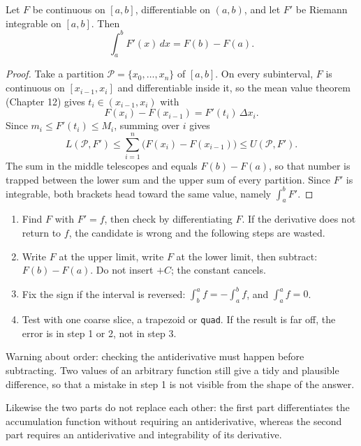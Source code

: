 \begin{teorema}
Let $F$ be continuous on $[a,b]$, differentiable on $(a,b)$, and let $F'$ be
Riemann integrable on $[a,b]$. Then
\[
\int_a^b F'(x)\,dx=F(b)-F(a).
\]
\end{teorema}

\begin{proof}
Take a partition $\mathcal{P}=\{x_0,\dots,x_n\}$ of $[a,b]$. On every subinterval, $F$ is
continuous on $[x_{i-1},x_i]$ and differentiable inside it, so the mean value
theorem (Chapter 12) gives $t_i\in(x_{i-1},x_i)$ with
\[
F(x_i)-F(x_{i-1})=F'(t_i)\,\Delta x_i .
\]
Since $m_i\le F'(t_i)\le M_i$, summing over $i$ gives
\[
L(\mathcal{P},F')\le\sum_{i=1}^{n}\bigl(F(x_i)-F(x_{i-1})\bigr)\le U(\mathcal{P},F').
\]
The sum in the middle telescopes and equals $F(b)-F(a)$, so that number is trapped
between the lower sum and the upper sum of every partition. Since $F'$ is integrable, both
brackets head toward the same value, namely $\int_a^b F'$.
\end{proof}

\begin{resep}
\begin{enumerate}
\item Find $F$ with $F'=f$, then check by differentiating $F$. If the derivative does not
      return to $f$, the candidate is wrong and the following steps are wasted.
\item Write $F$ at the upper limit, write $F$ at the lower limit, then subtract:
      $F(b)-F(a)$. Do not insert $+C$; the constant cancels.
\item Fix the sign if the interval is reversed: $\int_b^a f=-\int_a^b f$, and
      $\int_a^a f=0$.
\item Test with one coarse slice, a trapezoid or \texttt{quad}. If the result is far off,
      the error is in step 1 or 2, not in step 3.
\end{enumerate}
Warning about order: checking the antiderivative must happen before subtracting. Two values of an
arbitrary function still give a tidy and plausible difference, so that a mistake in
step 1 is not visible from the shape of the answer.
\end{resep}

Likewise the two parts do not replace each other: the first part differentiates the
accumulation function without requiring an antiderivative, whereas the second part requires an
antiderivative and integrability of its derivative.

